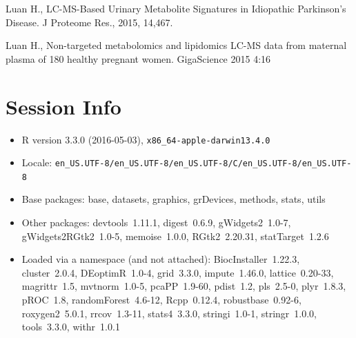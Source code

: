 \documentclass[english]{article}
\begin{document}
\noindent Luan H., LC-MS-Based Urinary Metabolite Signatures in Idiopathic 
Parkinson's Disease. J Proteome Res., 2015, 14,467.

\noindent Luan H., Non-targeted metabolomics and lipidomics LC-MS data 
from maternal plasma of 180 healthy pregnant women. GigaScience 2015 4:16




\section{Session Info}

\begin{itemize}\raggedright
  \item R version 3.3.0 (2016-05-03), \verb|x86_64-apple-darwin13.4.0|
  \item Locale: \verb|en_US.UTF-8/en_US.UTF-8/en_US.UTF-8/C/en_US.UTF-8/en_US.UTF-8|
  \item Base packages: base, datasets, graphics, grDevices, methods, stats, utils
  \item Other packages: devtools~1.11.1, digest~0.6.9, gWidgets2~1.0-7,
    gWidgets2RGtk2~1.0-5, memoise~1.0.0, RGtk2~2.20.31, statTarget~1.2.6
  \item Loaded via a namespace (and not attached): BiocInstaller~1.22.3, cluster~2.0.4,
    DEoptimR~1.0-4, grid~3.3.0, impute~1.46.0, lattice~0.20-33, magrittr~1.5,
    mvtnorm~1.0-5, pcaPP~1.9-60, pdist~1.2, pls~2.5-0, plyr~1.8.3, pROC~1.8,
    randomForest~4.6-12, Rcpp~0.12.4, robustbase~0.92-6, roxygen2~5.0.1, rrcov~1.3-11,
    stats4~3.3.0, stringi~1.0-1, stringr~1.0.0, tools~3.3.0, withr~1.0.1
\end{itemize}
\end{document}
